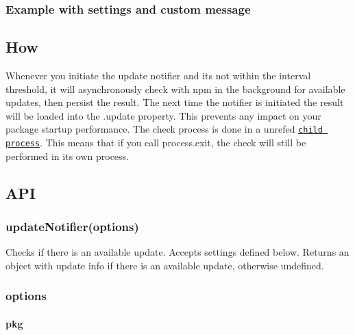 \subsubsection*{Example with settings and custom message}




\subsection*{How}

Whenever you initiate the update notifier and it\textquotesingle{}s not within the interval threshold, it will asynchronously check with npm in the background for available updates, then persist the result. The next time the notifier is initiated the result will be loaded into the {\ttfamily .update} property. This prevents any impact on your package startup performance. The check process is done in a unref\textquotesingle{}ed \href{http://nodejs.org/api/child_process.html#child_process_child_process_spawn_command_args_options}{\tt child process}. This means that if you call {\ttfamily process.\+exit}, the check will still be performed in its own process.

\subsection*{A\+PI}

\subsubsection*{update\+Notifier(options)}

Checks if there is an available update. Accepts settings defined below. Returns an object with update info if there is an available update, otherwise {\ttfamily undefined}.

\subsubsection*{options}

\paragraph*{pkg}

